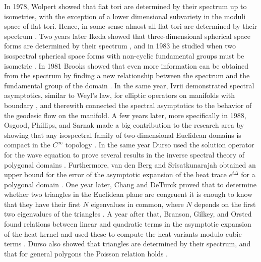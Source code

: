 \documentclass{amsart}
\theoremstyle{definition}
\begin{document}
In 1978, Wolpert showed that flat tori are determined by their spectrum up to isometries, with the exception of a lower dimensional subvariety in the moduli space of flat tori. Hence, in some sense almost all flat tori are determined by their spectrum \cite{wolpert1978eigenvalue}. Two years later Ikeda showed that three-dimensional spherical space forms are determined by their spectrum \cite{ikeda1980spectrum}, and in 1983 he studied when two isospectral spherical space forms with non-cyclic fundamental groups must be isometric \cite{ikeda1983spherical}. In 1981 Brooks showed that even more information can be obtained from the spectrum by finding a new relationship between the spectrum and the fundamental group of the domain \cite{brooks1981fundamental}.  In the same year, Ivrii demonstrated spectral asymptotics, similar to Weyl's law, for elliptic operators on manifolds with boundary \cite{ivrii1981asymptotics}, 
and therewith connected the spectral asymptotics to the behavior of the geodesic flow on the manifold.   A few years later, more specifically in 1988, Osgood, Phillips, and Sarnak made a big contribution to the research area by showing that any isospectral family of two-dimensional Euclidean domains is compact in the $C^\infty$ topology \cite{osgood1988compact2} \cite{osgood1988compact1}. In the same year Durso used the solution operator for the wave equation to prove several results in the inverse spectral theory of polygonal domains \cite{durso1988inverse}. Furthermore, van den Berg and Srisatkunarajah obtained an upper bound for the error of the asymptotic expansion of the heat trace $e^{t\Delta}$ for a polygonal domain \cite{van1988heat}. One year later, Chang and DeTurck proved that to determine whether two triangles in the Euclidean plane are congruent it is enough to know that they have their first $N$ eigenvalues in common, where $N$ depends on the first two eigenvalues of the triangles \cite{chang1989hearing}. A year after that, Branson, Gilkey, and Orsted found relations between linear and quadratic terms in the asymptotic expansion of the heat kernel and used these to compute the heat variants modulo cubic terms \cite{branson1990leading}. Durso also showed that triangles are determined by their spectrum, and that for general polygons the Poisson relation holds \cite{durso1990solution}.
\end{document}
